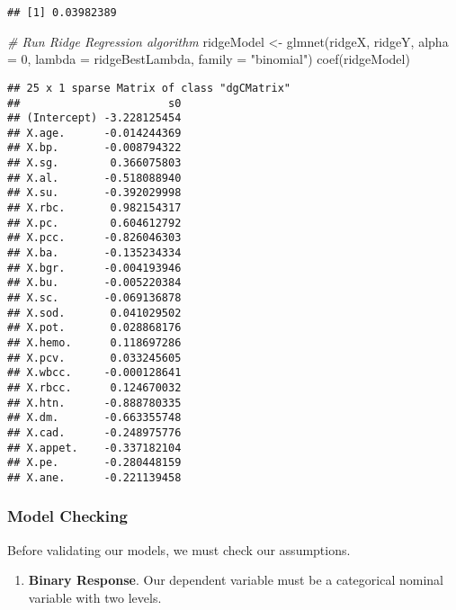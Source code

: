 \documentclass[
]{article}
\newenvironment{Shaded}{\begin{snugshade}}{\end{snugshade}}
\newcommand{\AttributeTok}[1]{\textcolor[rgb]{0.77,0.63,0.00}{#1}}
\newcommand{\CommentTok}[1]{\textcolor[rgb]{0.56,0.35,0.01}{\textit{#1}}}
\newcommand{\DecValTok}[1]{\textcolor[rgb]{0.00,0.00,0.81}{#1}}
\newcommand{\FunctionTok}[1]{\textcolor[rgb]{0.00,0.00,0.00}{#1}}
\newcommand{\NormalTok}[1]{#1}
\newcommand{\OtherTok}[1]{\textcolor[rgb]{0.56,0.35,0.01}{#1}}
\newcommand{\SpecialCharTok}[1]{\textcolor[rgb]{0.00,0.00,0.00}{#1}}
\newcommand{\StringTok}[1]{\textcolor[rgb]{0.31,0.60,0.02}{#1}}
\providecommand{\tightlist}{%
  \setlength{\itemsep}{0pt}\setlength{\parskip}{0pt}}
\begin{document}
\begin{verbatim}
## [1] 0.03982389
\end{verbatim}

\begin{Shaded}
\begin{Highlighting}[]
\CommentTok{\# Run Ridge Regression algorithm}
\NormalTok{ridgeModel }\OtherTok{\textless{}{-}} \FunctionTok{glmnet}\NormalTok{(ridgeX, ridgeY, }\AttributeTok{alpha =} \DecValTok{0}\NormalTok{, }\AttributeTok{lambda =}\NormalTok{ ridgeBestLambda, }
    \AttributeTok{family =} \StringTok{"binomial"}\NormalTok{)}
\FunctionTok{coef}\NormalTok{(ridgeModel)}
\end{Highlighting}
\end{Shaded}

\begin{verbatim}
## 25 x 1 sparse Matrix of class "dgCMatrix"
##                       s0
## (Intercept) -3.228125454
## X.age.      -0.014244369
## X.bp.       -0.008794322
## X.sg.        0.366075803
## X.al.       -0.518088940
## X.su.       -0.392029998
## X.rbc.       0.982154317
## X.pc.        0.604612792
## X.pcc.      -0.826046303
## X.ba.       -0.135234334
## X.bgr.      -0.004193946
## X.bu.       -0.005220384
## X.sc.       -0.069136878
## X.sod.       0.041029502
## X.pot.       0.028868176
## X.hemo.      0.118697286
## X.pcv.       0.033245605
## X.wbcc.     -0.000128641
## X.rbcc.      0.124670032
## X.htn.      -0.888780335
## X.dm.       -0.663355748
## X.cad.      -0.248975776
## X.appet.    -0.337182104
## X.pe.       -0.280448159
## X.ane.      -0.221139458
\end{verbatim}

\hypertarget{model-checking}{%
\subsubsection{Model Checking}\label{model-checking}}

Before validating our models, we must check our assumptions.

\begin{enumerate}
\def\labelenumi{\arabic{enumi}.}
\tightlist
\item
  \textbf{Binary Response}. Our dependent variable must be a categorical
  nominal variable with two levels.
\end{enumerate}

\begin{Shaded}
\end{Shaded}
\end{document}
